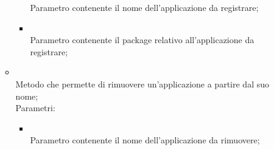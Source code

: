 \begin{itemize}
\begin{itemize}
\begin{itemize}
			Parametro contenente il nome dell'applicazione da registrare;
			\item {} \\
			Parametro contenente il package relativo all'applicazione da registrare;
		\end{itemize}
		\item[]  \\
		Metodo che permette di rimuovere un'applicazione a partire dal suo nome;\\
		Parametri:
		\begin{itemize}
			\item {} \\
			Parametro contenente il nome dell'applicazione da rimuovere;
		\end{itemize}
	\end{itemize}
\end{itemize}
\FloatBarrier

